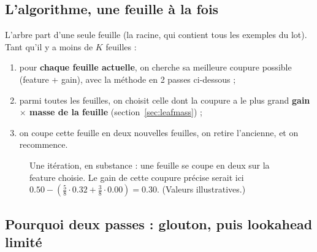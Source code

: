 \documentclass[12pt,a4paper]{article}
\theoremstyle{remark}
\begin{document}
\subsection{L'algorithme, une feuille à la fois}

L'arbre part d'une seule feuille (la racine, qui contient tous les exemples du
lot). Tant qu'il y a moins de $K$ feuilles :

\begin{enumerate}
  \item pour \textbf{chaque feuille actuelle}, on cherche sa meilleure coupure
        possible (feature + gain), avec la méthode en 2 passes ci-dessous ;
  \item parmi toutes les feuilles, on choisit celle dont la coupure a le plus
        grand \textbf{gain $\times$ masse de la feuille} (section~\ref{sec:leafmass}) ;
  \item on coupe cette feuille en deux nouvelles feuilles, on retire l'ancienne,
        et on recommence.
\end{enumerate}

\begin{figure}[h]
\centering
{}
\caption{Une itération, en substance : une feuille se coupe en deux sur la
feature choisie. Le gain de cette coupure précise
serait ici $0.50 - (\tfrac58{\cdot}0.32+\tfrac38{\cdot}0.00)=0.30$. (Valeurs illustratives.)}
\label{fig:one-split}
\end{figure}

\subsection{Pourquoi deux passes : glouton, puis lookahead limité}
\end{document}
